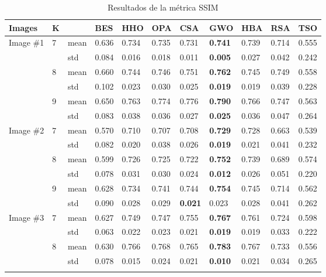 \documentclass[conference]{IEEEtran}
\begin{document}
\begin{table*}
\centering
\caption{Resultados de la métrica SSIM}
\begin{tabularx}{\textwidth}{|X|X|X|X|X|X|X|X|X|X|X|}
\hline
Images & K & & BES & HHO & OPA & CSA & GWO & HBA & RSA & TSO \\ \hline
\multirow{6}{*}{Image \#1} & \multirow{2}{*}{7} & mean & 0.636 & 0.734 & 0.735 & 0.731 & \textbf{0.741} & 0.739 & 0.714 & 0.555\\ \cline{3-11} 
& & std & 0.084 & 0.016 & 0.018 & 0.011 & \textbf{0.005} & 0.027 & 0.042 & 0.242\\ \cline{2-11} 
& \multirow{2}{*}{8} & mean & 0.660 & 0.744 & 0.746 & 0.751 & \textbf{0.762} & 0.745 & 0.749 & 0.558 \\ \cline{3-11} 
& & std &0.102 & 0.023 & 0.030 & 0.025 & \textbf{0.019} & 0.019 & 0.039 & 0.228\\ \cline{2-11} 
& \multirow{2}{*}{9} & mean & 0.650 & 0.763 & 0.774 & 0.776 & \textbf{0.790} & 0.766 & 0.747 & 0.563\\ \cline{3-11} 
& & std &0.083 & 0.038 & 0.036 & 0.027 & \textbf{0.025} & 0.036 & 0.047 & 0.264\\ \hline
\multirow{6}{*}{Image \#2} & \multirow{2}{*}{7} & mean & 0.570 & 0.710 & 0.707 & 0.708 & \textbf{0.729} & 0.728 & 0.663 & 0.539 \\ \cline{3-11} 
& & std &0.082 & 0.020 & 0.038 & 0.026 & \textbf{0.019} & 0.021 & 0.041 & 0.232\\ \cline{2-11} 
& \multirow{2}{*}{8} & mean & 0.599 & 0.726 & 0.725 & 0.722 & \textbf{0.752} & 0.739 & 0.689 & 0.574\\ \cline{3-11} 
& & std & 0.078 & 0.031 & 0.030 & 0.024 & \textbf{0.012} & 0.026 & 0.051 & 0.220\\ \cline{2-11} 
& \multirow{2}{*}{9} & mean &0.628 & 0.734 & 0.741 & 0.744 & \textbf{0.754} & 0.745 & 0.714 & 0.562\\ \cline{3-11} 
& & std & 0.090 & 0.028 & 0.029 & \textbf{0.021} & 0.023 & 0.028 & 0.041 & 0.262\\ \hline
\multirow{6}{*}{Image \#3} & \multirow{2}{*}{7} & mean & 0.627 & 0.749 & 0.747 & 0.755 & \textbf{0.767} & 0.761 & 0.724 & 0.598 \\ \cline{3-11} 
& & std &0.063 & 0.022 & 0.023 & 0.021 & \textbf{0.019} & 0.019 & 0.033 & 0.222\\ \cline{2-11} 
& \multirow{2}{*}{8} & mean & 0.630 & 0.766 & 0.768 & 0.765 & \textbf{0.783} & 0.767 & 0.733 & 0.556 \\ \cline{3-11} 
& & std & 0.078 & 0.015 & 0.024 & 0.021 & \textbf{0.010} & 0.021 & 0.034 & 0.265\\ \cline{2-11} 

\end{tabularx}
\end{table*}
\end{document}
